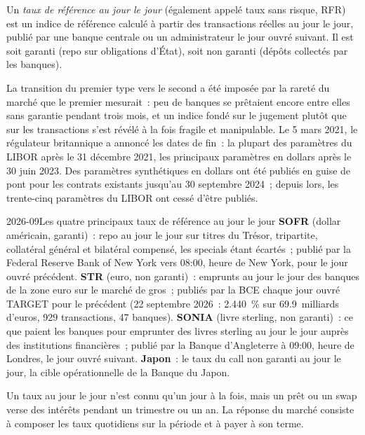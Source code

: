 \begin{definition}\label{def:m2:central-banks-and-the-short-rate:rfr}
Un \emph{taux de référence au jour le jour} (également
appelé taux sans risque, RFR) est un indice de référence calculé à partir
des transactions réelles au jour le jour, publié par une banque centrale ou un administrateur le
jour ouvré suivant. Il est soit garanti (repo sur obligations d'État), soit non garanti
(dépôts collectés par les banques).
\end{definition}

La transition du premier type vers le second a été imposée par la rareté
du marché que le premier mesurait~: peu de banques se prêtaient encore entre elles
sans garantie pendant trois mois, et un indice fondé sur le jugement plutôt que sur les
transactions s'est révélé à la fois fragile et manipulable. Le 5 mars 2021, le régulateur britannique
a annoncé les dates de fin~: la plupart des paramètres du LIBOR après le 31 décembre
2021, les principaux paramètres en dollars après le 30 juin 2023. Des paramètres synthétiques en dollars
ont été publiés en guise de pont pour les contrats existants jusqu'au 30 septembre 2024~;
depuis lors, les trente-cinq paramètres du LIBOR ont cessé d'être publiés.

\begin{dated}{2026-09}{Les quatre principaux taux de référence au jour le jour}\label{dat:m2:central-banks-and-the-short-rate:benchmarks}
\textbf{SOFR} (dollar américain, garanti)~: repo au jour le jour sur titres du Trésor, tripartite,
collatéral général et bilatéral compensé, les specials étant écartés~;
publié par la Federal Reserve Bank of New York vers 08:00, heure de New York,
pour le jour ouvré précédent. \textbf{\texteuro STR} (euro,
non garanti)~: emprunts au jour le jour des banques de la zone euro sur le marché de gros~; publiés par
la BCE chaque jour ouvré TARGET pour le précédent (22 septembre 2026~: 2.440~\%
sur 69.9~milliards d'euros, 929 transactions, 47 banques). \textbf{SONIA} (livre sterling,
non garanti)~: ce que paient les banques pour emprunter des livres sterling au jour le jour
auprès des institutions financières~; publié par la Banque d'Angleterre à 09:00, heure de Londres, le
jour ouvré suivant.
\textbf{Japon}~: le taux du call non garanti au jour le jour, la cible
opérationnelle de la Banque du Japon.
\end{dated}

Un taux au jour le jour n'est connu qu'un jour à la fois, mais un prêt ou un swap
verse des intérêts pendant un trimestre ou un an. La réponse du marché consiste à composer les taux
quotidiens sur la période et à payer à son terme.

